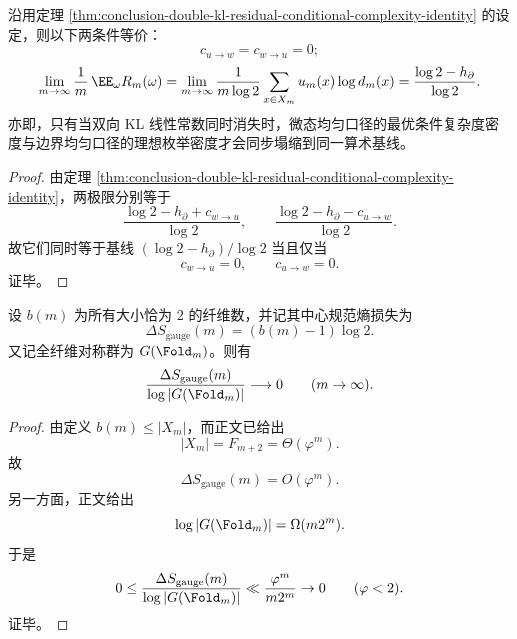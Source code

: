 \begin{corollary}[双口径残差码率的同步塌缩判据]\label{cor:conclusion-double-kl-residual-rate-synchronous-collapse}
沿用定理 \ref{thm:conclusion-double-kl-residual-conditional-complexity-identity} 的设定，则以下两条件等价：
\[
c_{u\to w}=c_{w\to u}=0;
\]
\[
\lim_{m\to\infty}\frac1m\,\EE_\omega R_m(\omega)
=
\lim_{m\to\infty}\frac{1}{m\log 2}\sum_{x\in X_m}u_m(x)\log d_m(x)
=
\frac{\log 2-h_\partial}{\log 2}.
\]
亦即，只有当双向 KL 线性常数同时消失时，微态均匀口径的最优条件复杂度密度与边界均匀口径的理想枚举密度才会同步塌缩到同一算术基线。
\end{corollary}
\begin{proof}
由定理 \ref{thm:conclusion-double-kl-residual-conditional-complexity-identity}，两极限分别等于
\[
\frac{\log 2-h_\partial+c_{w\to u}}{\log 2},
\qquad
\frac{\log 2-h_\partial-c_{u\to w}}{\log 2}.
\]
故它们同时等于基线 \((\log 2-h_\partial)/\log 2\) 当且仅当
\[
c_{w\to u}=0,\qquad c_{u\to w}=0.
\]
证毕。
\end{proof}

\begin{theorem}[中心规范熵在全纤维对称中的零占比]\label{thm:conclusion-central-gauge-entropy-zero-share}
设 \(b(m)\) 为所有大小恰为 \(2\) 的纤维数，并记其中心规范熵损失为
\[
\Delta S_{\mathrm{gauge}}(m)=(b(m)-1)\log 2.
\]
又记全纤维对称群为 \(G(\Fold_m)\)。则有
\[
\frac{\Delta S_{\mathrm{gauge}}(m)}{\log |G(\Fold_m)|}\longrightarrow 0
\qquad (m\to\infty).
\]
\end{theorem}
\begin{proof}
由定义 \(b(m)\le |X_m|\)，而正文已给出
\[
|X_m|=F_{m+2}=\Theta(\varphi^m).
\]
故
\[
\Delta S_{\mathrm{gauge}}(m)=O(\varphi^m).
\]
另一方面，正文给出
\[
\log |G(\Fold_m)|=\Omega(m2^m).
\]
于是
\[
0\le
\frac{\Delta S_{\mathrm{gauge}}(m)}{\log |G(\Fold_m)|}
\ll
\frac{\varphi^m}{m2^m}\to 0
\qquad (\varphi<2).
\]
证毕。
\end{proof}

